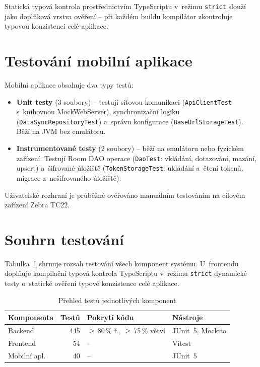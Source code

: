 Statická typová kontrola prostřednictvím TypeScriptu v~režimu \texttt{strict} slouží jako doplňková vrstva ověření -- při každém buildu kompilátor zkontroluje typovou konzistenci celé aplikace.

\section{Testování mobilní aplikace}

Mobilní aplikace obsahuje dva typy testů:

\begin{itemize}
	\item \textbf{Unit testy} (3 soubory) -- testují síťovou komunikaci (\texttt{ApiClient\-Test} s~knihovnou MockWebServer), synchronizační logiku (\texttt{DataSync\-Repository\-Test}) a~správu konfigurace (\texttt{BaseUrl\-Storage\-Test}). Běží na JVM bez emulátoru.
	\item \textbf{Instrumentované testy} (2 soubory) -- běží na emulátoru nebo fyzickém zařízení. Testují Room DAO operace (\texttt{DaoTest}: vkládání, dotazování, mazání, upsert) a~šifrované úložiště (\texttt{TokenStorageTest}: ukládání a~čtení tokenů, migrace z~nešifrovaného úložiště).
\end{itemize}

Uživatelské rozhraní je průběžně ověřováno manuálním testováním na cílovém zařízení Zebra TC22.

\section{Souhrn testování}

Tabulka~\ref{tab:tests} shrnuje rozsah testování všech komponent systému. U~frontendu doplňuje kompilační typová kontrola TypeScriptu v~režimu \texttt{strict} dynamické testy o~statické ověření typové konzistence celé aplikace.

\begin{table}[H]\centering
\renewcommand{\arraystretch}{1.3}
\caption{Přehled testů jednotlivých komponent}\label{tab:tests}
\begin{tabular}{l|r|l|l}
	\textbf{Komponenta} & \textbf{Testů} & \textbf{Pokrytí kódu} & \textbf{Nástroje} \tabularnewline \hline
	Backend & 445 & $\geq$\,80\,\% ř., $\geq$\,75\,\% větví & JUnit~5, Mockito \tabularnewline
	Frontend & 54 & -- & Vitest \tabularnewline
	Mobilní apl. & 40 & -- & JUnit~5 \tabularnewline
\end{tabular}
\end{table}

